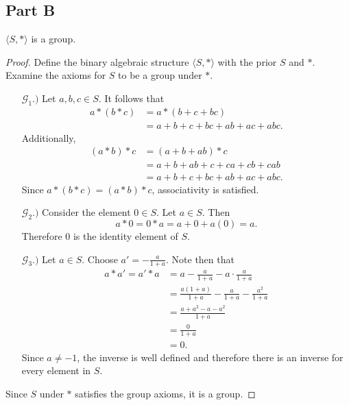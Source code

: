 \documentclass[12pt]{extarticle}
\begin{document}
\subsection{Part B}
$\langle S, * \rangle$ is a group.

\begin{proof}
	Define the binary algebraic structure $\langle S, * \rangle$ with the prior $S$ and $*$. Examine the axioms for $S$ to be a group under $*$.
	\begin{enumerate}[leftmargin=1.4cm]
		\item[$\mathcal{G}_1 .)$]
		Let $a,b,c \in S$. It follows that
		\begin{align*}
			a * (b * c) &= a * (b + c + bc) \\
			&= a + b + c + bc + ab + ac + abc
		.\end{align*}
		Additionally,
		\begin{align*}
			(a * b) * c &= (a + b + ab) * c \\
			&= a + b + ab + c + ca + cb + cab \\
			&= a + b + c + bc + ab + ac + abc
		.\end{align*}
		Since $a * (b * c) = (a * b) * c$, associativity is satisfied.
		\item[$\mathcal{G}_2 .)$]
		Consider the element $0 \in S$. Let $a \in S$. Then
		\[
			a * 0 = 0 * a = a + 0 + a(0) = a
		.\]
		Therefore $0$ is the identity element of $S$.
		\item[$\mathcal{G}_3 .)$]
			Let $a \in S$. Choose $a' = -\frac{a}{1+a}$. Note then that
			\begin{align*}
				a * a' = a' * a &= a - \frac{a}{1+a} - a \cdot \frac{a}{1 + a} \\
				&= \frac{a(1+a)}{1+a} - \frac{a}{1+a} - \frac{a^2}{1+a} \\
				&= \frac{a+a^2 - a - a^2}{1+a} \\
				&= \frac{0}{1+a} \\
				&= 0
			.\end{align*}
			Since $a \neq -1$, the inverse is well defined and therefore there is an inverse for every element in $S$.
	\end{enumerate}
	
	Since $S$ under $*$ satisfies the group axioms, it is a group.
\end{proof}
\end{document}
